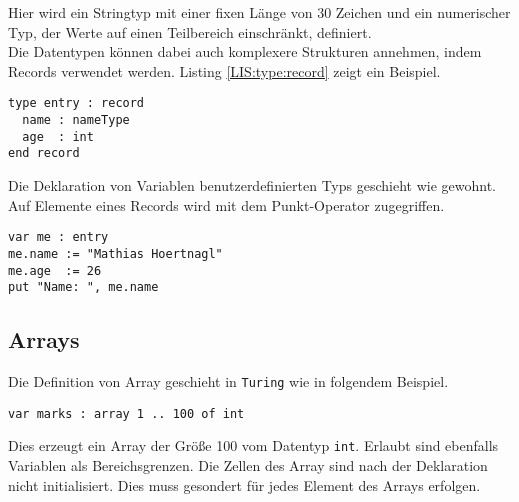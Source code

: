 Hier wird ein Stringtyp mit einer fixen L\"ange von 30 Zeichen und ein numerischer Typ, der Werte auf einen Teilbereich einschr\"ankt, definiert. \\
Die Datentypen k\"onnen dabei auch komplexere Strukturen annehmen, indem Records verwendet werden. Listing \ref{LIS:type:record} zeigt ein Beispiel.

\lstset{label=LIS:type:record}
\begin{table}[h!]
\begin{lstlisting}
type entry : record
  name : nameType
  age  : int
end record
\end{lstlisting}
\end{table}

Die Deklaration von Variablen benutzerdefinierten Typs geschieht wie gewohnt. Auf Elemente eines Records wird mit dem Punkt-Operator zugegriffen. 

\lstset{label=LIS:type:record:usage}
\begin{table}[h!]
\begin{lstlisting}
var me : entry
me.name := "Mathias Hoertnagl"
me.age  := 26
put "Name: ", me.name
\end{lstlisting}
\end{table}

\newpage

\subsection{Arrays}

Die Definition von Array geschieht in \texttt{Turing} wie in folgendem Beispiel.

\lstset{label=LIS:arr:def}
\begin{table}[h!]
\begin{lstlisting}
var marks : array 1 .. 100 of int
\end{lstlisting}
\end{table}

Dies erzeugt ein Array der Gr\"o\ss{}e 100 vom Datentyp \lstinline{int}. Erlaubt sind ebenfalls Variablen als Bereichsgrenzen. Die Zellen des Array sind nach der Deklaration nicht initialisiert. Dies muss gesondert f\"ur jedes Element des Arrays erfolgen. 

